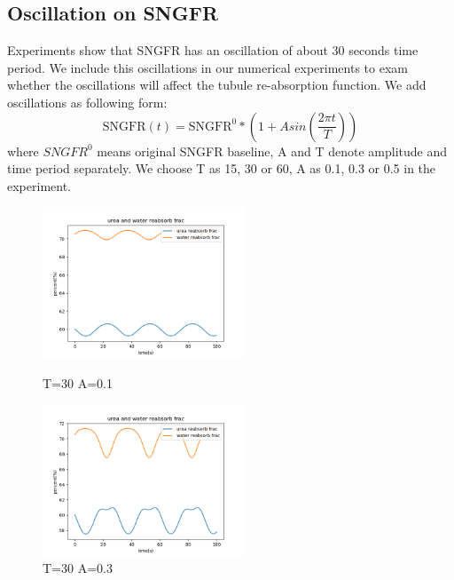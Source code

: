 \documentclass{article}
\begin{document}
\subsection{Oscillation on SNGFR}
Experiments show that SNGFR has an oscillation of about 30 seconds time period. We include this oscillations in our numerical experiments to exam whether the oscillations will affect the tubule re-absorption function. We add oscillations as following form:
\begin{equation}
\mathrm{SNGFR}(t)=\mathrm{SNGFR}^{0}*(1+Asin(\frac{2\pi t}{T} ))
\end{equation}
where $SNGFR^{0}$ means original SNGFR baseline, A and T denote amplitude and time period separately. We choose T as 15, 30 or 60, A as 0.1, 0.3 or 0.5 in the experiment.

\begin{figure}[H]
\centering
\begin{minipage}[t]{0.48\textwidth}
\centering
\includegraphics[width=6cm]{figure/figure5.png}
\caption{T=30 A=0.1}
\end{minipage}
\begin{minipage}[t]{0.48\textwidth}
\centering
\includegraphics[width=6cm]{figure/figure6.png}
\caption{T=30 A=0.3}
\end{minipage}
\end{figure}
\end{document}
